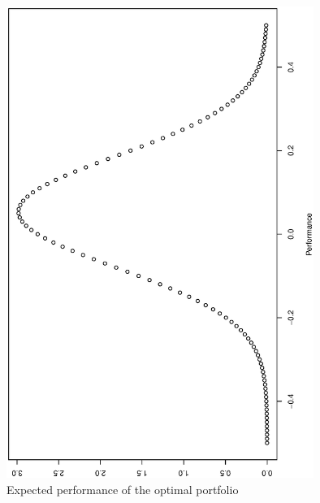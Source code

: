 \begin{figure}[ht]
\centering
\includegraphics[width=10cm, angle=270]{Q2_2plot.eps}
\caption{Expected performance of the optimal portfolio}
\label{fig4}
\end{figure}
